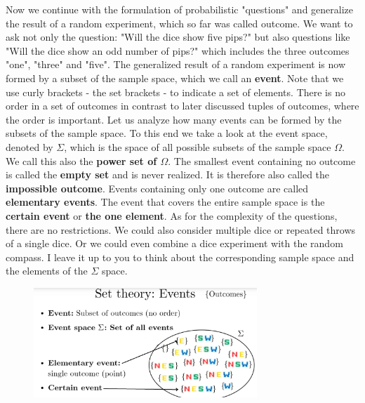 \documentclass[12pt, a4paper]{scrartcl}
\begin{document}
Now we continue with the formulation of probabilistic "questions" and generalize the result of a random experiment, which so far was called outcome. We want to ask not only the question: "Will the dice show five pips?" but also questions like "Will the dice show an odd number of pips?" which includes the three outcomes "one", "three" and "five".
The generalized result of a random experiment is now formed by a subset of the sample space, which we call an \textbf{event}. Note that we use curly brackets - the set brackets - to indicate a set of elements. There is no order in a set of outcomes in contrast to later discussed tuples of outcomes, where the order is important.
Let us analyze how many events can be formed by the subsets of the sample space. To this end we take a look at the event space, denoted by $\Sigma$, which is the space of all possible subsets of the sample space $\Omega$. We call this also the \textbf{power set of $\Omega$}. 
The smallest event containing no outcome is called the \textbf{empty set} and is never realized. It is therefore also called the \textbf{impossible outcome}.
Events containing only one outcome are called \textbf{elementary events}.
The event that covers the entire sample space is the \textbf{certain event} or \textbf{the one element}. As for the complexity of the questions, there are no restrictions.  We could also consider multiple dice or repeated throws of a single dice. Or we could even combine a dice experiment with the random compass. I leave it up to you to think about the corresponding sample space and the elements of the $\Sigma$ space.\\
\begin{figure}[H]
	\centering
	\includegraphics[width=0.75\textwidth]{1_1.png}
\end{figure}
\\
\end{document}
